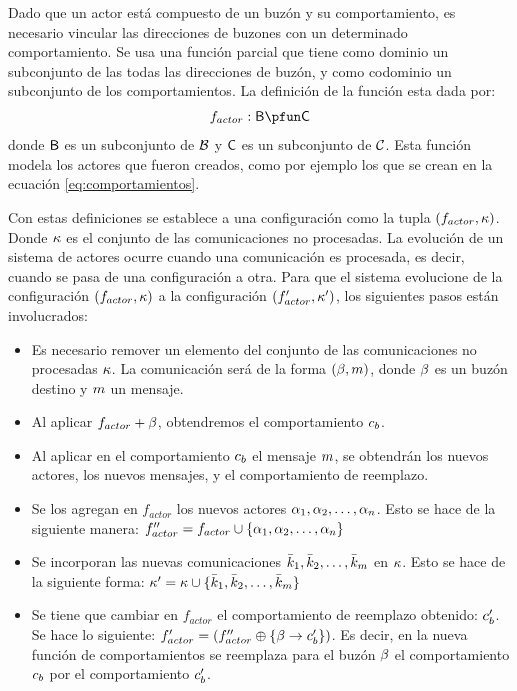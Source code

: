 Dado que un actor está compuesto de un buzón y su comportamiento, es necesario vincular las direcciones de buzones con un determinado comportamiento. Se usa una función parcial que tiene como dominio un subconjunto de las todas las direcciones de buzón, y como codominio un subconjunto de los comportamientos. La definición de la función esta dada por:
\begin{align}\label{eq:actores}
f_{actor} : \BUZONESSUB \pfun \COMPORTAMIENTOSSUB
\end{align}
donde $\mathsf{B}$ es un subconjunto de $\mathcal{B}$ y $\mathsf{C}$ es un subconjunto de $\mathcal{C}$. Esta función modela los actores que fueron creados, como por ejemplo los que se crean en la ecuación \eqref{eq:comportamientos}. 

Con estas definiciones se establece a una configuración como la tupla $(f_{actor}, \kappa)$. Donde $\kappa$ es el conjunto de las comunicaciones no procesadas. La evolución de un sistema de actores ocurre cuando una comunicación es procesada, es decir, cuando se pasa de una configuración a otra. Para que el sistema evolucione de la configuración $(f_{actor}, \kappa)$ a la configuración $(f'_{actor}, \kappa')$, los siguientes pasos están involucrados:
\begin{itemize}
 \item Es necesario remover un elemento del conjunto de las comunicaciones no procesadas $\kappa$. La comunicación será de la forma $(\beta, m)$, donde $\beta$ es un buzón destino y $m$ un mensaje. 
 \item Al aplicar $f_{actor} + \beta$, obtendremos el comportamiento $c_b$. 
 \item Al aplicar en el comportamiento $c_b$ el mensaje $m$, se obtendrán los nuevos actores, los nuevos mensajes, y el comportamiento de reemplazo.
 \item Se los agregan en $f_{actor}$ los nuevos actores $\alpha_1, \alpha_2, \ldots, \alpha_n$. Esto se hace de la siguiente manera: $f''_{actor} = f_{actor} \cup \{ \alpha_1, \alpha_2, \ldots, \alpha_n \}$
 \item Se incorporan las nuevas comunicaciones $\bar{k}_1, \bar{k}_2, \ldots, \bar{k}_m$ en $\kappa$. Esto se hace de la siguiente forma: $\kappa' = \kappa \cup \{ \bar{k}_1, \bar{k}_2, \ldots, \bar{k}_m \}$
 \item Se tiene que cambiar en $f_{actor}$ el comportamiento de reemplazo obtenido: $c_b'$. Se hace lo siguiente:  $f'_{actor} = ( f''_{actor} \oplus \{ \beta \rightarrow c'_b \})$. Es decir, en la nueva función de comportamientos se reemplaza para el buzón $\beta$ el comportamiento $c_b$ por el comportamiento $c'_b$.
\end{itemize} 

